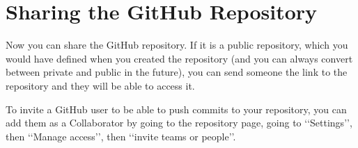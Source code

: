 \documentclass[letterpaper, 12pt]{article}
\begin{document}
\section{Sharing the GitHub Repository}
Now you can share the GitHub repository. If it is a public repository, which you would have defined when you created the repository (and you can always convert between private and public in the future), you can send someone the link to the repository and they will be able to access it.

To invite a GitHub user to be able to push commits to your repository, you can add them as a Collaborator by going to the repository page, going to \lq\lq Settings\rq\rq, then \lq\lq Manage access\rq\rq, then \lq\lq invite teams or people\rq\rq.
\end{document}
